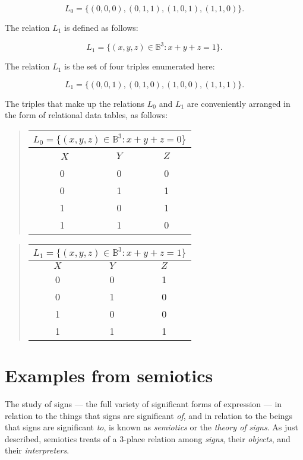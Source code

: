 \documentclass[12pt]{article}
\begin{document}
\[ L_0 = \{ (0, 0, 0), (0, 1, 1), (1, 0, 1), (1, 1, 0) \}. \]

The relation $L_1$ is defined as follows:

\[ L_1 = \{ (x, y, z) \in \mathbb{B}^3 : x + y + z = 1 \}. \]

The relation $L_1$ is the set of four triples enumerated here:

\[ L_1 = \{ (0, 0, 1), (0, 1, 0), (1, 0, 0), (1, 1, 1) \}. \]

The triples that make up the relations $L_0$ and $L_1$ are conveniently arranged in the form of relational data tables, as follows:

\begin{quote}
\begin{tabular}{|c|c|c|}
\multicolumn{3}{c}{$L_0 = \{ (x, y, z) \in \mathbb{B}^3 : x + y + z = 0 \}$} \\
\hline\
$X$ & $Y$ & $Z$ \\
\hline\hline
 0  &  0  &  0  \\
\hline
 0  &  1  &  1  \\
\hline
 1  &  0  &  1  \\
\hline
 1  &  1  &  0  \\
\hline
\end{tabular}
\end{quote}

\begin{quote}
\begin{tabular}{|c|c|c|}
\multicolumn{3}{c}{$L_1 = \{ (x, y, z) \in \mathbb{B}^3 : x + y + z = 1 \}$} \\
\hline
$X$ & $Y$ & $Z$ \\
\hline\hline
 0  &  0  &  1  \\
\hline
 0  &  1  &  0  \\
\hline
 1  &  0  &  0  \\
\hline
 1  &  1  &  1  \\
\hline
\end{tabular}
\end{quote}

\section{Examples from semiotics}

The study of signs --- the full variety of significant forms of expression --- in relation to the things that signs are significant \textit{of}, and in relation to the beings that signs are significant \textit{to}, is known as \textit{semiotics} or the \textit{theory of signs}.  As just described, semiotics treats of a 3-place relation among \textit{signs}, their \textit{objects}, and their \textit{interpreters}.
\end{document}
